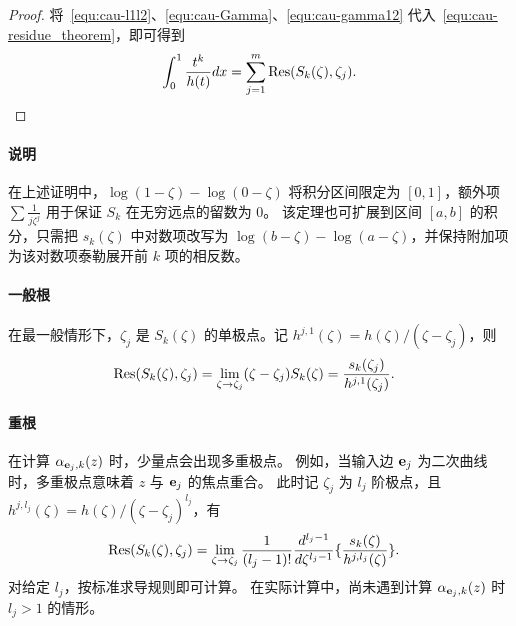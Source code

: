 \begin{proof}
    将~\eqref{equ:cau-l1l2}、\eqref{equ:cau-Gamma}、\eqref{equ:cau-gamma12} 代入~\eqref{equ:cau-residue_theorem}，即可得到
    \begin{equation}
        \int_0^1 \frac{t^k}{ h(t)}dx=\sum_{j=1}^{m}\mathop{\mathrm{Res}}(S_k(\zeta),\zeta_j).
    \end{equation}
\end{proof}

\paragraph{说明}
在上述证明中，$\log(1-\zeta) - \log(0-\zeta)$ 将积分区间限定为 \([0,1]\)，额外项 $\sum \frac{1}{j \zeta^j}$ 用于保证 \(S_k\) 在无穷远点的留数为 0。
该定理也可扩展到区间 \([a,b]\) 的积分，只需把 $s_k(\zeta)$ 中对数项改写为 \(\log(b-\zeta)-\log(a-\zeta)\)，并保持附加项为该对数项泰勒展开前 $k$ 项的相反数。

\paragraph{一般根}
在最一般情形下，\( \zeta_j \) 是 \( S_k(\zeta) \) 的单极点。记 $h^{j,1}(\zeta)=h(\zeta)/(\zeta-\zeta_j)$，则
\begin{equation}\label{equ:cau-gene_expression}
\begin{aligned}
    &\mathop{\mathrm{Res}}(S_k(\zeta),\zeta_j)=\lim_{\zeta\to \zeta_j}(\zeta-\zeta_j)S_k(\zeta)=\frac{s_k(\zeta_j)}{h^{j,1}(\zeta_j)}.
    \end{aligned}
\end{equation}

\paragraph{重根}
在计算 \(\alpha_{\mathbf{e}_j,k}(z)\) 时，少量点会出现多重极点。
例如，当输入边 $\mathbf{e}_j$ 为二次曲线时，多重极点意味着 \(z\) 与 $\mathbf{e}_j$ 的焦点重合。
此时记 \( \zeta_j \) 为 $l_j$ 阶极点，且 $h^{j,l_j}(\zeta)=h(\zeta)/(\zeta-\zeta_j)^{l_j}$，有
\begin{equation}\label{equ:cau-repeated_expression}
\begin{aligned}
&\mathop{\mathrm{Res}}(S_k(\zeta),\zeta_j)
    =\lim_{\zeta\to \zeta_j}\frac{1}{(l_j-1)!}\frac{d^{l_j-1}}{d\zeta^{l_j-1}}\{\frac{s_k(\zeta)}{h^{j,l_j}(\zeta)}\}.
    \end{aligned}
\end{equation}
对给定 $l_j$，按标准求导规则即可计算。
在实际计算中，尚未遇到计算 \(\alpha_{\mathbf{e}_j,k}(z)\) 时 $l_j>1$ 的情形。

